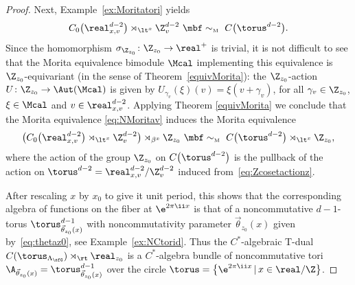 \begin{proof}
Next, Example~\ref{ex:Moritatori} yields
\begin{gather}\label{eq:NMoritav}
C_0\big(\real_{x,v}^{d-2}\big)\rtimes_{\lt^x} \Z_{v}^{d-2} \ \mbf\sim_{\text{\tiny M}} \
C\big(\torus^{d-2}\big) .
\end{gather}
Since the homomorphism
$\sigma_{\Z_{ z_0}}\colon \Z_{ z_0}\to\real^+$ is trivial, it is not difficult to see
that the Morita equivalence bimodule $\Mcal$ implementing this
equivalence is $\Z_{ z_0}$-equivariant (in the sense of Theorem~\ref{equivMorita}):
the $\Z_{ z_0}$-action
$U\colon \Z_{ z_0}\rightarrow \Aut(\Mcal)$ is given by $U_{\gamma_v}(\xi)(v)=\xi(v+\gamma_v)$, for all $\gamma_v\in
\Z_{ z_0}$, $\xi\in \Mcal$ and $v\in \real_{x,v}^{d-2} $.
Applying Theorem \ref{equivMorita} we conclude that the
Morita equivalence \eqref{eq:NMoritav} induces the Morita equivalence
\begin{gather}\label{eq:fibreNCMostow}
\big(C_0\big(\real^{d-2}_{x,v}\big)\rtimes_{\lt^x}\Z^{d-2}_{v}\big) \rtimes_{\beta^x}
\Z_{ z_0} \ \mbf\sim_{\text{\tiny M}} \
C\big(\torus^{d-2}\big)\rtimes_{\lt^x}\Z_{ z_0} ,
\end{gather}
where the action
of the group $\Z_{ z_0}$ on $C\big(\torus^{d-2}\big)$ is the pullback of the action on
$\torus^{d-2}=\real_{x,v}^{d-2}/\Z_{v}^{d-2}$ induced
from~\eqref{eq:Zcosetactionz}.

After rescaling $x$ by $x_0$
to give it unit period, this shows that the
corresponding algebra of functions on the fiber at $\e^{2\pi\ii x}$ is that
of a noncommutative $d{-}1$-torus $\torus_{\vec\theta_{
 z_0}(x)}^{d-1}$ with noncommutativity parameter
$\vec\theta_{z_0}(x)$ given by~\eqref{eq:thetaz0}, see Example~\ref{ex:NCtorid}.
Thus the $C^*$-algebraic T-dual
$C(\torus_{\Lambda_\sfG})\rtimes_\rt\real_{ z_0}$ is a $C^*$-algebra bundle
of noncommutative tori $\A_{\vec\theta_{
 z_0}(x)}=\torus^{d-1}_{\vec\theta_{ z_0}(x)}$ over the
circle $\torus=\big\{\e^{2\pi\ii x}\, | \, x\in \real/\Z\big\}$.
\end{proof}


